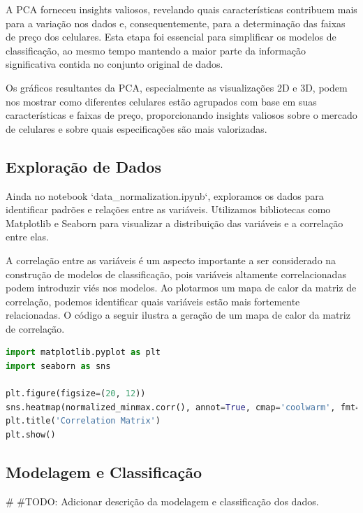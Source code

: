 \documentclass[conference]{IEEEtran}
\begin{document}
A PCA forneceu insights valiosos, revelando quais características contribuem 
mais para a variação nos dados e, consequentemente, para a determinação 
das faixas de preço dos celulares. 
Esta etapa foi essencial para simplificar os modelos de classificação, 
ao mesmo tempo mantendo a maior parte da informação significativa contida 
no conjunto original de dados.

Os gráficos resultantes da PCA, especialmente as visualizações 2D e 3D, 
podem nos mostrar como diferentes celulares estão agrupados com base em 
suas características e faixas de preço, proporcionando insights valiosos 
sobre o mercado de celulares e sobre quais especificações são mais valorizadas.

\subsection{Exploração de Dados}

Ainda no notebook `data\_normalization.ipynb`,
exploramos os dados para identificar padrões e relações entre as variáveis.
Utilizamos bibliotecas como Matplotlib e Seaborn para visualizar a distribuição
das variáveis e a correlação entre elas.
 
A correlação entre as variáveis é um aspecto importante a ser considerado
na construção de modelos de classificação, pois variáveis altamente correlacionadas
podem introduzir viés nos modelos. Ao plotarmos um mapa de calor da matriz de correlação,
podemos identificar quais variáveis estão mais fortemente relacionadas.
O código a seguir ilustra a geração de um mapa de calor da matriz de correlação.

\begin{lstlisting}[language=Python]
import matplotlib.pyplot as plt
import seaborn as sns

plt.figure(figsize=(20, 12))
sns.heatmap(normalized_minmax.corr(), annot=True, cmap='coolwarm', fmt='.2f', linewidths=2)
plt.title('Correlation Matrix')
plt.show()
\end{lstlisting}

\subsection{Modelagem e Classificação}#
#TODO: Adicionar descrição da modelagem e classificação dos dados.

\end{document}
